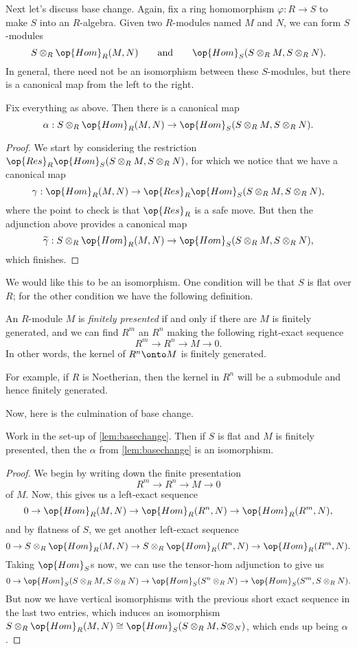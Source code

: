 Next let's discuss base change. Again, fix a ring homomorphism $\varphi:R\to S$ to make $S$ into an $R$-algebra. Given two $R$-modules named $M$ and $N$, we can form $S$-modules
\[S\otimes_R\op{Hom}_R(M,N)\qquad\text{and}\qquad\op{Hom}_S(S\otimes_RM,S\otimes_RN).\]
In general, there need not be an isomorphism between these $S$-modules, but there is a canonical map from the left to the right.
\begin{lemma} \label{lem:basechange}
	Fix everything as above. Then there is a canonical map
	\[\alpha:S\otimes_R\op{Hom}_R(M,N)\to\op{Hom}_S(S\otimes_RM,S\otimes_RN).\]
\end{lemma}
\begin{proof}
	We start by considering the restriction $\op{Res}_R\op{Hom}_S(S\otimes_RM,S\otimes_RN)$, for which we notice that we have a canonical map
	\[\gamma:\op{Hom}_R(M,N)\to\op{Res}_R\op{Hom}_S(S\otimes_RM,S\otimes_RN),\]
	where the point to check is that $\op{Res}_R$ is a safe move. But then the adjunction above provides a canonical map
	\[\widetilde\gamma:S\otimes_R\op{Hom}_R(M,N)\to\op{Hom}_S(S\otimes_RM,S\otimes_RN),\]
	which finishes. 
\end{proof}
We would like this to be an isomorphism. One condition will be that $S$ is flat over $R$; for the other condition we have the following definition.
\begin{definition}
	An $R$-module $M$ is \textit{finitely presented} if and only if there are $M$ is finitely generated, and we can find $R^m$ an $R^n$ making the following right-exact sequence
	\[R^m\to R^n\to M\to 0.\]
	In other words, the kernel of $R^n\onto M$ is finitely generated.
\end{definition}
\begin{example}
	For example, if $R$ is Noetherian, then the kernel in $R^n$ will be a submodule and hence finitely generated.
\end{example}
Now, here is the culmination of base change.
\begin{proposition}
	Work in the set-up of \autoref{lem:basechange}. Then if $S$ is flat and $M$ is finitely presented, then the $\alpha$ from \autoref{lem:basechange} is an isomorphism.
\end{proposition}
\begin{proof}
	We begin by writing down the finite presentation
	\[R^m\to R^n\to M\to 0\]
	of $M$. Now, this gives us a left-exact sequence\todo{}
	\[0\to\op{Hom}_R(M,N)\to\op{Hom}_R(R^n,N)\to\op{Hom}_R(R^m,N),\]
	and by flatness of $S$, we get another left-exact sequence
	\[0\to S\otimes_R\op{Hom}_R(M,N)\to S\otimes_R\op{Hom}_R(R^n,N)\to\op{Hom}_R(R^m,N).\]
	Taking $\op{Hom}_S$s now, we can use the tensor-hom adjunction to give us
	\[0\to\op{Hom}_S(S\otimes_RM,S\otimes_RN)\to\op{Hom}_S(S^n\otimes_RN)\to\op{Hom}_S(S^m,S\otimes_RN).\]
	But now we have vertical isomorphisms with the previous short exact sequence in the last two entries, which induces an isomorphism $S\otimes_R\op{Hom}_R(M,N)\cong\op{Hom}_S(S\otimes_RM,S\otimes_N)$, which ends up being $\alpha$.
\end{proof}

